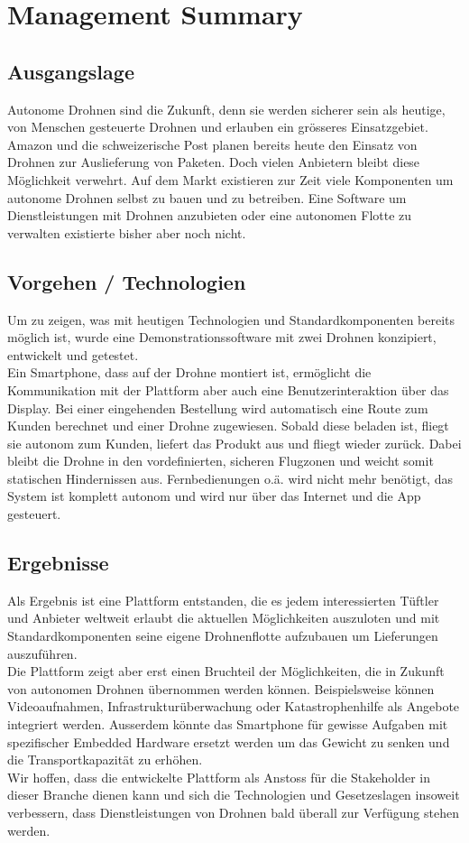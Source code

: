 \newpage
{}
\chapter*{Management Summary}
\section*{Ausgangslage}
Autonome Drohnen sind die Zukunft, denn sie werden sicherer sein als heutige, von Menschen gesteuerte Drohnen und erlauben ein grösseres Einsatzgebiet. Amazon und die schweizerische Post planen bereits heute den Einsatz von Drohnen zur Auslieferung von Paketen. Doch vielen Anbietern bleibt diese Möglichkeit verwehrt. Auf dem Markt existieren zur Zeit viele Komponenten um autonome Drohnen selbst zu bauen und zu betreiben. Eine Software um Dienstleistungen mit Drohnen anzubieten oder eine autonomen Flotte zu verwalten existierte bisher aber noch nicht.

\section*{Vorgehen / Technologien}
Um zu zeigen, was mit heutigen Technologien und Standardkomponenten bereits möglich ist, wurde eine Demonstrationssoftware mit zwei Drohnen konzipiert, entwickelt und getestet.  \\

Ein Smartphone, dass auf der Drohne montiert ist, ermöglicht die Kommunikation mit der Plattform aber auch eine Benutzerinteraktion über das Display. Bei einer eingehenden Bestellung wird automatisch eine Route zum Kunden berechnet und einer Drohne zugewiesen. Sobald diese beladen ist, fliegt sie autonom zum Kunden, liefert das Produkt aus und fliegt wieder zurück. Dabei bleibt die Drohne in den vordefinierten, sicheren Flugzonen und weicht somit statischen Hindernissen aus. Fernbedienungen o.ä. wird nicht mehr benötigt, das System ist komplett autonom und wird nur über das Internet und die App gesteuert.

\section*{Ergebnisse}
Als Ergebnis ist eine Plattform entstanden, die es jedem interessierten Tüftler und Anbieter weltweit erlaubt die aktuellen Möglichkeiten auszuloten und mit Standardkomponenten seine eigene Drohnenflotte aufzubauen um Lieferungen auszuführen.\\

Die Plattform zeigt aber erst einen Bruchteil der Möglichkeiten, die in Zukunft von autonomen Drohnen übernommen werden können. Beispielsweise können Videoaufnahmen, Infrastrukturüberwachung oder Katastrophenhilfe als Angebote integriert werden. Ausserdem könnte das Smartphone für gewisse Aufgaben mit spezifischer Embedded Hardware ersetzt werden um das Gewicht zu senken und die Transportkapazität zu erhöhen. \\

Wir hoffen, dass die entwickelte Plattform als Anstoss für die Stakeholder in dieser Branche dienen kann und sich die Technologien und Gesetzeslagen insoweit verbessern, dass Dienstleistungen von Drohnen bald überall zur Verfügung stehen werden.